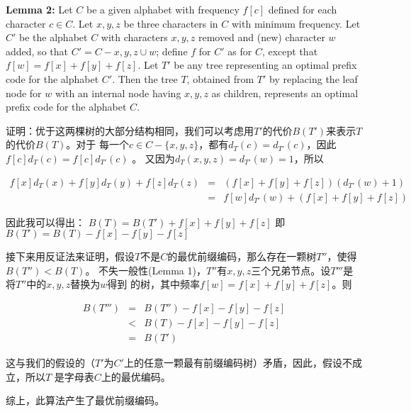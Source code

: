 \documentclass{article}
\begin{document}
\begin{CJK}{UTF8}{gbsn}
\textbf{Lemma 2:} Let $C$ be a given alphabet with frequency $f[c]$ defined for
each character $c \in C$. Let $x,y,z$ be three characters in $C$ with minimum
frequency. Let $C'$ be the alphabet $C$ with characters $x, y, z$ removed and
(new) character $w$ added, so that $C' = C - {x, y, z} \cup {w}$; define $f$ for
$C'$ as for $C$, except that $f[w] = f[x] + f[y] + f[z]$. Let $T'$ be any tree
representing an optimal prefix code for the alphabet $C'$. Then the tree $T$,
obtained from $T'$ by replacing the leaf node for $w$ with an internal node
having $x, y, z$ as children, represents an optimal prefix code for the alphabet
$C$.\newline

证明：优于这两棵树的大部分结构相同，我们可以考虑用$T'$的代价$B(T')$来表示$T$的代价$B(T)$。对于
每一个$c \in C - \{x,y,z\}$，都有$d_T(c) = d_{T'}(c)$，因此$f[c]d_T(c)=f[c]d_{T'}(c)$ 。
又因为$d_T(x,y,z) = d_{T'}(w)=1$，所以

\begin{eqnarray*}
f[x]d_T(x) + f[y]d_T(y) + f[z]d_T(z) &=& (f[x]+f[y]+f[z])(d_{T'}(w)+1)\\
									 &=& f[w]d_{T'}(w) + (f[x]+f[y]+f[z])
\end{eqnarray*}

因此我可以得出：\newline
$B(T) = B(T') + f[x]+f[y]+f[z]$\newline
即\newline
$B(T') = B(T) - f[x]-f[y]-f[z]$

接下来用反证法来证明，假设$T$不是$C$的最优前缀编码，那么存在一颗树$T''$，使得$B(T'')<B(T)$。
不失一般性(Lemma 1)，$T''$有$x,y,z$三个兄弟节点。设$T'''$是将$T''$中的$x,y,z$替换为$w$得到
的树，其中频率$f[w] = f[x]+f[y]+f[z]$。则

\begin{displaymath}
\begin{array}{ccl}
B(T''') & = & B(T'') - f[x]-f[y]-f[z]\\
		& < & B(T) - f[x]-f[y]-f[z]\\
		& = & B(T') 
\end{array}
\end{displaymath}

这与我们的假设的（$T'$为$C'$上的任意一颗最有前缀编码树）矛盾，因此，假设不成立，所以$T$
是字母表$C$上的最优编码。

综上，此算法产生了最优前缀编码。
\end{CJK}
\end{document}
